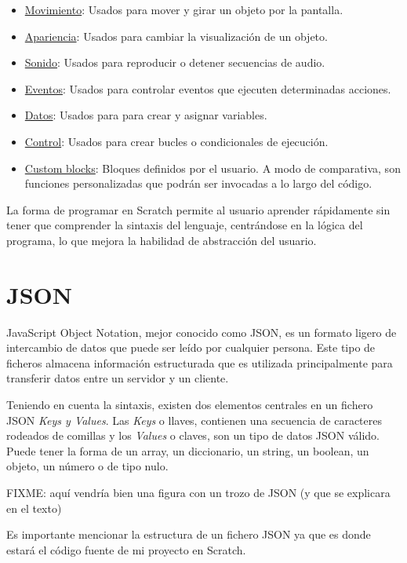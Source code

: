 \documentclass[a4paper, 12pt]{book}
\begin{document}
\begin{itemize}
  	\item \underline{Movimiento}: Usados para mover y girar un objeto por la pantalla.
  	\item \underline{Apariencia}: Usados para cambiar la visualización de un objeto.
  	\item \underline{Sonido}: Usados para reproducir o detener secuencias de audio.
  	\item \underline{Eventos}: Usados para controlar eventos que ejecuten determinadas acciones.
  	\item \underline{Datos}: Usados para para crear y asignar variables.
  	\item \underline{Control}: Usados para crear bucles o condicionales de ejecución.
  	\item \underline{Custom blocks}: Bloques definidos por el usuario. A modo de comparativa, son funciones personalizadas que podrán ser invocadas a lo largo del código.
\end{itemize}

La forma de programar en Scratch permite al usuario aprender rápidamente sin tener que comprender la sintaxis del lenguaje, centrándose en la lógica del programa, lo que mejora la habilidad de abstracción del usuario\cite{arotuma2017programacion}.

\section{JSON}
\label{sec:Json}

JavaScript Object Notation, mejor conocido como JSON, es un formato ligero de intercambio de datos que puede ser leído por cualquier persona. Este tipo de ficheros almacena información estructurada que es utilizada principalmente para transferir datos entre un servidor y un cliente\cite{jsonWeb}.

Teniendo en cuenta la sintaxis, existen dos elementos centrales en un fichero JSON \textit{Keys y Values}. Las \textit{Keys} o llaves, contienen una secuencia de caracteres rodeados de comillas y los \textit{Values} o claves, son un tipo de datos JSON válido. Puede tener la forma de un array, un diccionario, un string, un boolean, un objeto, un número o de tipo nulo. 

FIXME: aquí vendría bien una figura con un trozo de JSON (y que se explicara en el texto)

Es importante mencionar la estructura de un fichero JSON ya que es donde estará el código fuente de mi proyecto en Scratch.
\end{document}
